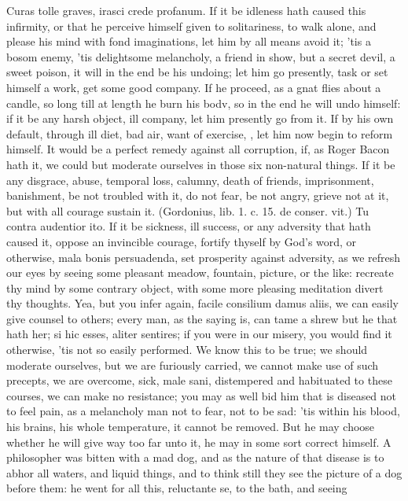 {Curas tolle graves, irasci crede profanum. If it be idleness hath
caused this infirmity, or that he perceive himself given to
solitariness, to walk alone, and please his mind with fond
imaginations, let him by all means avoid it; 'tis a bosom enemy, 'tis
delightsome melancholy, a friend in show, but a secret devil, a sweet
poison, it will in the end be his undoing; let him go presently, task
or set himself a work, get some good company. If he proceed, as a gnat
flies about a candle, so long till at length he burn his bodv, so in
the end he will undo himself: if it be any harsh object, ill company,
let him presently go from it. If by his own default, through ill diet,
bad air, want of exercise, \etc{}, let him now begin to reform himself. It
would be a perfect remedy against all corruption, if, as Roger
Bacon hath it, we could but moderate ourselves in those six non-natural
things. If it be any disgrace, abuse, temporal loss, calumny,
death of friends, imprisonment, banishment, be not troubled with it, do
not fear, be not angry, grieve not at it, but with all courage sustain
it. (Gordonius, lib. 1. c. 15. de conser. vit.) Tu contra audentior
ito. If it be sickness, ill success, or any adversity that hath
caused it, oppose an invincible courage, fortify thyself by God's word,
or otherwise, mala bonis persuadenda, set prosperity against adversity,
as we refresh our eyes by seeing some pleasant meadow, fountain,
picture, or the like: recreate thy mind by some contrary object, with
some more pleasing meditation divert thy thoughts.
Yea, but you infer again, facile consilium damus aliis, we can easily
give counsel to others; every man, as the saying is, can tame a shrew
but he that hath her; si hic esses, aliter sentires; if you were in our
misery, you would find it otherwise, 'tis not so easily performed. We
know this to be true; we should moderate ourselves, but we are
furiously carried, we cannot make use of such precepts, we are
overcome, sick, male sani, distempered and habituated to these courses,
we can make no resistance; you may as well bid him that is diseased not
to feel pain, as a melancholy man not to fear, not to be sad: 'tis
within his blood, his brains, his whole temperature, it cannot be
removed. But he may choose whether he will give way too far unto it, he
may in some sort correct himself. A philosopher was bitten with a mad
dog, and as the nature of that disease is to abhor all waters, and
liquid things, and to think still they see the picture of a dog before
them: he went for all this, reluctante se, to the bath, and seeing
}
